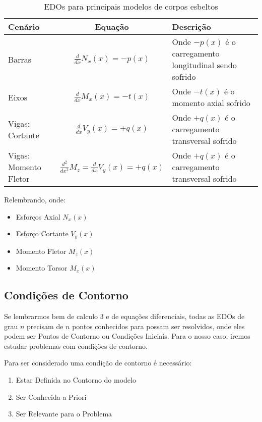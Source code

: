 \documentclass{article}
\begin{document}
            \begin{table}[h]
                \centering
                \begin{tabular}{|l|c|l|}\hline
                    \textbf{Cenário} & \textbf{Equação} & \textbf{Descrição}\\ \hline
                    \rule{0pt}{4ex} Barras & $\frac{d}{dx}N_x(x) = -p(x)$ & Onde $-p(x)$ é o carregamento longitudinal sendo sofrido \\[2ex]  \hline
                    \rule{0pt}{4ex} Eixos  & $\frac{d}{dx}M_x(x) = -t(x)$ & Onde $-t(x)$ é o momento axial sofrido \\[2ex]\hline
                    \rule{0pt}{4ex} Vigas: Cortante & $\frac{d}{dx}V_y(x) = +q(x)$ & Onde $+q(x)$ é o carregamento transversal sofrido \\[2ex] \hline
                    \rule{0pt}{4ex} Vigas: Momento Fletor & $\frac{d^2}{dx^2}M_z = \frac{d}{dx}V_y(x) = +q(x)$ & Onde $+q(x)$ é o carregamento transversal sofrido \\[2ex] \hline
                    
                \end{tabular}
                \caption{EDOs para principais modelos de corpos esbeltos}
                \label{tb:edo_esf_internos}
            \end{table}

            Relembrando, onde:
            \begin{itemize}
                \item Esforços Axial $N_x(x)$
                \item Esforço Cortante $V_y(x)$
                \item Momento Fletor $M_z(x)$
                \item Momento Torsor $M_x(x)$
            \end{itemize}

        \newpage
        \subsection{Condições de Contorno}
            Se lembrarmos bem de calculo 3 e de equações diferenciais, todas as EDOs de grau $n$ precisam de $n$ pontos conhecidos para possam ser resolvidos, onde eles podem ser Pontos de
            Contorno ou Condições Iniciais. Para o nosso caso, iremos estudar problemas com condições de contorno.

            Para ser considerado uma condição de contorno é necessário:
            \begin{enumerate}
                \item Estar Definida no Contorno do modelo 
                \item Ser Conhecida a Priori
                \item Ser Relevante para o Problema
            \end{enumerate}
\end{document}
